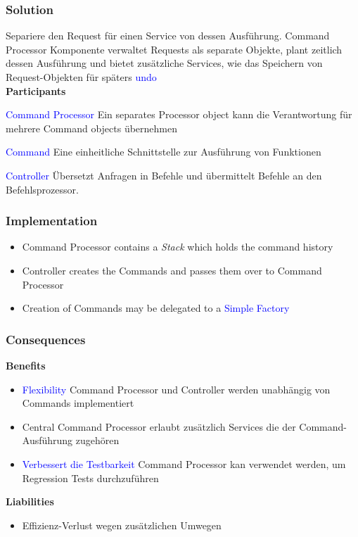 \subsubsection{Solution}
Separiere den Request für einen Service von dessen Ausführung. Command Processor Komponente verwaltet Requests als separate Objekte, plant zeitlich dessen Ausführung und bietet zusätzliche Services, wie das Speichern von Request-Objekten für späters \textcolor{blue}{undo} \\

\textbf{Participants}

\textcolor{blue}{Command Processor} Ein separates Processor object kann die Verantwortung für mehrere Command objects übernehmen

\textcolor{blue}{Command} Eine einheitliche Schnittstelle zur Ausführung von Funktionen

\textcolor{blue}{Controller} Übersetzt Anfragen in Befehle und übermittelt Befehle an den Befehlsprozessor.

\subsubsection{Implementation}
\begin{itemize}
    \item Command Processor contains a \textit{Stack} which holds the command history
    \item Controller creates the Commands and passes them over to Command Processor
    \item Creation of Commands may be delegated to a \textcolor{blue}{Simple Factory}
\end{itemize}

\subsubsection{Consequences}
\textbf{Benefits}
\begin{itemize}
    \item \textcolor{blue}{Flexibility} Command Processor und Controller werden unabhängig von Commands implementiert
    \item Central Command Processor erlaubt zusätzlich Services die der Command-Ausführung zugehören
    \item \textcolor{blue}{Verbessert die Testbarkeit} Command Processor kan verwendet werden, um Regression Tests
    durchzuführen
\end{itemize}
\vspace{10pt}
\textbf{Liabilities}
\begin{itemize}
    \item Effizienz-Verlust wegen zusätzlichen Umwegen
\end{itemize}


